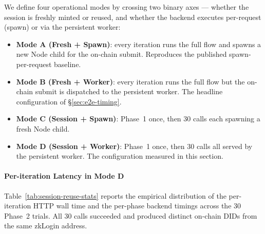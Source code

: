 We define four operational modes by crossing two binary axes — whether
the session is freshly minted or reused, and whether the backend
executes per-request (spawn) or via the persistent worker:
\begin{itemize}\itemsep0pt
  \item \textbf{Mode A (Fresh + Spawn)}: every iteration runs the full
        flow and spawns a new Node child for the on-chain submit.
        Reproduces the published spawn-per-request baseline.
  \item \textbf{Mode B (Fresh + Worker)}: every iteration runs the full
        flow but the on-chain submit is dispatched to the persistent
        worker. The headline configuration of \S\ref{sec:e2e-timing}.
  \item \textbf{Mode C (Session + Spawn)}: Phase~1 once, then 30 calls
        each spawning a fresh Node child.
  \item \textbf{Mode D (Session + Worker)}: Phase~1 once, then 30 calls
        all served by the persistent worker. The configuration measured
        in this section.
\end{itemize}

\paragraph{Per-iteration Latency in Mode D}
\label{sec:session-reuse-results}

Table~\ref{tab:session-reuse-stats} reports the empirical distribution
of the per-iteration HTTP wall time and the per-phase backend timings
across the 30 Phase~2 trials. All 30 calls succeeded and produced
distinct on-chain DIDs from the same zkLogin address.

